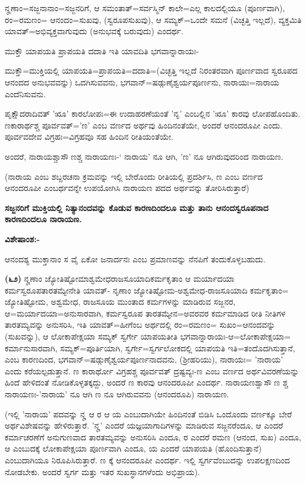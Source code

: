ನೄಣಾಂ=ಸಜ್ಜನಾನಾಂ=ಸಜ್ಜನರಿಗೆ, ಆ ಸಮಂತಾತ್=ಸರ್ವಸ್ಮಿನ್ ಕಾಲೇ=ಎಲ್ಲ ಕಾಲದಲ್ಲಿಯೂ (ಪೂರ್ಣವಾಗಿ), ರಂ=ರಮಣಂ= ಆನಂದಂ=ಸುಖವು, (ಸ್ವರೂಪಸುಖವು), ಆ ಸಮ್ಯಕ್=ಒಂದೇ ಸಮನೆ (ವಿಚ್ಛತ್ತಿ ಇಲ್ಲದೆ), ವ್ಯಕ್ತಮಿತಿ ಯಾವತ್=ಅಭಿವ್ಯಕ್ತವಾಗುವುದು (ಅನುಭವಕ್ಕೆ ಬರುವುದು) ಎಂದರ್ಥ.

ಮುಕ್ತೌ ಯಾಪಯತಿ ಪ್ರಾಪಯತಿ ದದಾತಿ ಇತಿ ಯಾವದಿತಿ ಭಗವಾನ್ನಾರಾಯಃ-

ಮುಕ್ತೌ=ಮುಕ್ತಿಯಲ್ಲಿ ಯಾಪಯತಿ=ಪ್ರಾಪಯತಿ=ದದಾತಿ=(ವಿಚ್ಛತ್ತಿ ಇಲ್ಲದೆ ನಿರಂತರವಾಗಿ ಪೂರ್ಣವಾದ ಸ್ವರೂಪದ ಆನಂದದ ಅನುಭವವನ್ನು) ಒದಗಿಸುವವನು, ಭಗವಾನ್=\-ಷಡ್ಗುಣೈಶ್ವರ್ಯಪೂರ್ಣನು, ನಾರಾಯಃ=ನಾರಾಯ ಎಂದೆನಿಸುವನು.

ಪೃಕ್ಷೌದರಾದಿವತ್ 'ೠ' ಕಾರಲೋಪಃ=ಈ ಉದಾಹರಣೆಯಂತೆ 'ನೃ' ಎಂಬಲ್ಲಿನ 'ೠ' ಕಾರವು ಲೋಪಹೊಂದಿತು. ಣಕಾರಾರ್ಥಶ್ಚ ಪೂರ್ವವತ್='ಣ' ಎಂಬ ವರ್ಣದ ಅರ್ಥವು ಹಿಂದಿನಂತೆಯೇ, ಅಂದರೆ ಆನಂದರೂಪೀ ಎಂದು. ಪೂರ್ವವದೇವ ವಿಗ್ರಹಃ=ವಿಗ್ರಹವೂ ಸಹ ಹಿಂದಿನ ರೀತಿಯಂತೆಯೇ.

ಅಂದರೆ, ನಾರಾಯಶ್ಚಾಸೌ ಣಶ್ಚ ನಾರಾಯಣಃ-` ನಾರಾಯ' ನೂ ಆಗಿ, 'ಣ' ನೂ ಆಗಿರುವುದರಿಂದ ನಾರಾಯಣ.

\newpage

(ನಾರಾಯ ಎಂಬ ಶಬ್ದರಚನಾ ಕ್ರಮವನ್ನು ಇಲ್ಲಿ ಬೇರೊಂದು ರೀತಿಯಲ್ಲಿ ಪ್ರದರ್ಶಿಸಿ, ಣ ಎಂಬ ವರ್ಣದ ಆನಂದರೂಪೀ ಎಂಬರ್ಥವನ್ನೇ ಉಪಯೋಗಿಸಿ ನಾರಾಯಣ ಪದದ ಅರ್ಥವನ್ನು ತೋರಿಸಿರುತ್ತಾರೆ)

\begin{center}
\textbf{ಸಜ್ಜನರಿಗೆ ಮುಕ್ತಿಯಲ್ಲಿ ನಿತ್ಯಾನಂದವನ್ನು ಕೊಡುವ ಕಾರಣದಿಂದಲೂ ಮತ್ತು ತಾನು ಆನಂದಸ್ವರೂಪನಾದ ಕಾರಣದಿಂದಲೂ ನಾರಾಯಣ.}
\end{center}

\noindent
\textbf{ವಿಶೇಷಾಂಶ:-}

ಆನಂದಶ್ಯ ಮುಕ್ತಾನಾಂ ಸ ವೈ ಏಕೋ ಜನಾರ್ದನಃ ಎಂಬ ಪ್ರಮಾಣವನ್ನು ನೆನಪಿಗೆ ತಂದುಕೊಳ್ಳಬಹುದು.

\textbf{(೬೨)} ನೄಣಾಂ ಜ್ಯೋತಿಷ್ಟೋಮಾಶ್ವಮೇಧರಾಜಸೂಯಾದಿಕರ್ಮಕೃತಾಂ ಆ ಮರ್ಯಾ\-ದಯಾ ಕರ್ಮಸ್ವರೂಪತಾರತಮ್ಯೇನೇತಿ ಯಾವತ್- ನೃಣಾಂ ಜ್ಯೋತಿಷ್ಟೋಮ-ಅಶ್ವಮೇಧ-ರಾಜಸೂಯಾದಿ ಕರ್ಮಕೃತಾಂ= ಜ್ಯೋತಿಷ್ಟೋಮ, ಅಶ್ವಮೇಧ, ರಾಜಸೂಯ ಮುಂತಾದ ಕರ್ಮಗಳನ್ನು ಮಾಡಿರುವ ಸಜ್ಜನರ, ಆ=ಮರ್ಯಾದಯಾ=ಅನುಸಾರವಾಗಿ, ಕರ್ಮ\-ಸ್ವರೂಪ ತಾರತಮ್ಯೇನ=ಅವರವರ ಕರ್ಮಮಾಡಿದ ರೀತಿ ನೀತಿಗಳ ತಾರತಮ್ಯವನ್ನು ಅನುಸರಿಸಿ, ಇತಿ ಯಾವತ್=ಹೀಗೆಂಬ ಅರ್ಥದಲ್ಲಿ ರಂ=ರಮಣಂ= ಸುಖಂ=ಆನಂದವನ್ನು (ಸುಖವನ್ನು), ಆ ಲೋಕಾಪೇಕ್ಷಯಾ ಸಮ್ಯಕ್ ಸ್ವರ್ಗೇ ಯಾಪಯತೀತಿ ಭಗವಾನ್ನಾರಾಯಃ-ಆ=ಲೋಕಾಪೇಕ್ಷಯಾ= ಕರ್ಮಾನುಸಾರವಾಗಿ, ಸಮ್ಯಕ್=ಪೂರ್ತಿಯಾಗಿ, ಸ್ವರ್ಗೇ=ಸ್ವರ್ಗ\-ಲೋಕದಲ್ಲಿ ಯಾಪಯತಿ ಇತಿ=ತಂದೊದಗಿಸುತ್ತಾನೆ, ಎಂಬ ಕಾರಣದಿಂದ, ಭಗವಾನ್=\-ಷಡ್ಗುಣೈಶ್ವರ್ಯಪೂರ್ಣನಾದವನು, (ಶ‍್ರೀಹರಿಯು), ನಾರಾಯಃ= 'ನಾರಾಯ' ಎಂದು ಕರೆಯಲ್ಪಡುತ್ತಾನೆ. ಣ ಕಾರಾರ್ಥೋ ವಿಗ್ರಹಶ್ಚ ಪೂರ್ವವತ್ ದ್ರಷ್ಟವ್ಯಃ-ಣ ಎಂಬ ವರ್ಣದ ಅರ್ಥವಿವರಣೆಯನ್ನು ಹಿಂದೆ ಹೇಳಿದಂತೆ ನೋಡಿಕೊಳ್ಳತಕ್ಕದ್ದು, ಅಂದರೆ ಣ ಕಾರವು ಆನಂದರೂಪೀ ಎಂದರ್ಥ. ನಾರಾಯಣಶ್ವಾಸೌ ಣ ಶ್ಚ ನಾರಾಯಣಃ-'ನಾರಾಯ' ನೂ ಆಗಿ ಣ ನೂ ಆಗಿರುವವನು (ಆನಂದರೂಪಿ) ನಾರಾಯಣ.

(ಇಲ್ಲಿ 'ನಾರಾಯ' ಪದವನ್ನು ನೄ ಆ ರ ಆ ಯ ಎಂಬುದಾಗಿಯೇ ಹಿಂದಿನಂತೆ ಬಿಡಿಸಿ ಒಂದೊಂದು ವರ್ಣಕ್ಕೂ ಬೇರೆ ಅರ್ಥವಿಶೇಷವನ್ನು ಹೇಳಿರುತ್ತಾರೆ. 'ನೄ' ಎಂದರೆ ಯಜ್ಞಯಾಗಾದಿಗಳನ್ನು ಮಾಡಿರುವ ಸಜ್ಜನರೆಂದೂ, ಆ ಎಂದರೆ ಕರ್ಮಾಚರಣೆಗೆ ಅನುಗುಣವಾದ ತಾರತಮ್ಯವನ್ನು ಅನುಸರಿಸಿ ಎಂದೂ, ರ ಎಂದರೆ ರಮಣ (ಆನಂದ, ಸುಖ) ಎಂದೂ, ಆ ಎಂಬುದಕ್ಕೆ ಲೋಕಾಪೇಕ್ಷಯಾ ಪೂರ್ಣವಾಗಿ ಎಂದೂ, ಯ ಎಂದರೆ ಯಾಪಯತಿ (ಹೊಂದಿಸುತ್ತಾನೆ) ಎಂಬುದಾಗಿಯೂ ನಿರೂಪಿಸಿರುತ್ತಾರೆ. ಣ ಕ್ಕೆ ಆನಂದರೂಪೀ ಎಂದರ್ಥ. ಇಲ್ಲಿ ಸ್ವರ್ಗವೆಂಬುದನ್ನು ಉಪಲಕ್ಷಣದಿಂದ ನೋಡಬೇಕು. ಅಂದರೆ ಸ್ವರ್ಗ ಮತ್ತು ಇತರ ಸುಖಸ್ಥಾನಗಳೆಂದು ಅಭಿಪ್ರಾಯ).


